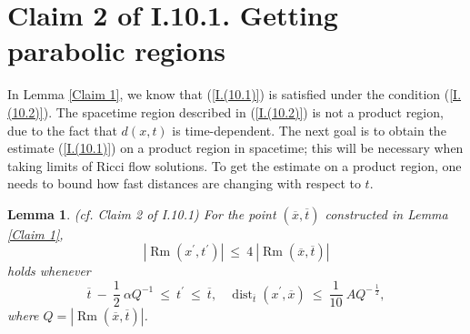 \documentclass[12pt]{amsart}
\newcommand{\dist}{\operatorname{dist}}
\newcommand{\Rm}{\operatorname{Rm}}
\numberwithin{equation}{section}
\theoremstyle{plain}
\newtheorem{lemma}[equation]{Lemma}
\theoremstyle{definition}
\theoremstyle{remark}
\begin{document}
\section{Claim 2 of I.10.1. Getting parabolic regions}

In Lemma \ref{Claim 1}, we know that (\ref{I.(10.1)}) is satisfied under the
condition (\ref{I.(10.2)}). The spacetime region described in (\ref{I.(10.2)})
is
not a product region, due to the fact that $d(x, t)$ is time-dependent.
The next goal is to obtain the estimate (\ref{I.(10.1)}) on a product region in
spacetime; this will be necessary when taking limits of Ricci flow solutions.
To get the estimate on a product region, one needs to bound 
how fast distances are changing with respect to $t$.

\begin{lemma} (cf. Claim 2 of I.10.1) \label{Claim 2}
For the point $(\overline{x}, \overline{t})$ constructed in Lemma \ref{Claim 1},
\begin{equation} \label{I.(10.1a)}
|\Rm(x^\prime,t^\prime)| \: \le \: 4 \: |\Rm(\overline{x}, \overline{t})|
\end{equation}
holds whenever
\begin{equation} \label{I.(10.3)}
\overline{t} \: - \: \frac12 \: \alpha Q^{-1} \: \le \:
t^\prime \: \le \: \overline{t}, 
\: \: \: \:
\dist_{\overline{t}}(x^\prime, \overline{x}) \: \le \: \frac{1}{10} \: A Q^{- \: \frac12},
\end{equation}
where $Q = |\Rm(\overline{x}, \overline{t})|$.
\end{lemma}
\end{document}
